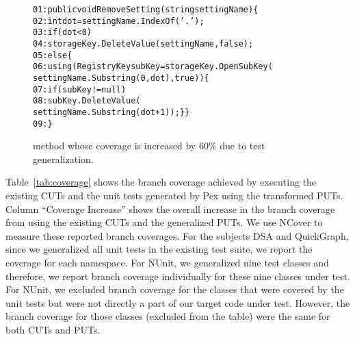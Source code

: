 \begin{figure}[t]
\begin{CodeOut}
\begin{alltt}
01: public void RemoveSetting(string settingName) \{
02: \hspace*{0.05in}int dot = settingName.IndexOf( '.' );
03: \hspace*{0.15in}if (dot < 0)
04: \hspace*{0.2in}storageKey.DeleteValue(settingName, false);
05: \hspace*{0.15in}else \{
06: \hspace*{0.2in}using(RegistryKey subKey = storageKey.OpenSubKey(
\hspace*{0.8in}settingName.Substring(0,dot),true))\{
07: \hspace*{0.3in}if (subKey != null)
08: \hspace*{0.5in}subKey.DeleteValue(
\hspace*{1.0in}settingName.Substring(dot + 1)); \} \}
09: \hspace*{0.02in}\} 
\end{alltt}
\end{CodeOut} \vspace*{-3ex}
\caption{ method whose coverage is increased by $60\%$ due to test generalization.} %
\label{fig:excoverage}
\end{figure}

Table~\ref{tab:coverage} shows the branch coverage achieved by executing the existing CUTs and the unit tests generated by Pex using the transformed PUTs. Column ``Coverage Increase'' shows the overall increase in the branch coverage from using the existing CUTs and the generalized PUTs. We use NCover to measure these reported branch coverages. For the subjects DSA and QuickGraph, since we generalized all unit tests in the existing test suite, we report the coverage for each namespace. For NUnit, we generalized nine test classes and therefore, we report branch coverage individually for these nine classes under test. For NUnit, we excluded branch coverage for the classes that were covered by the unit tests but were not directly a part of our target code under test. However, the branch coverage for those classes (excluded from the table) were the same for both CUTs and PUTs.


